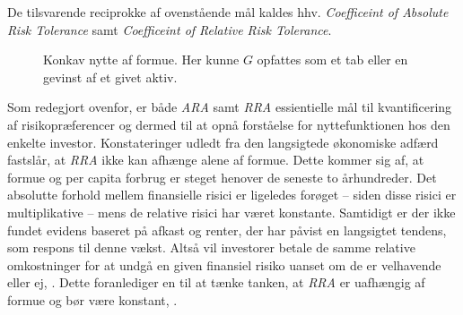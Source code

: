 \documentclass[
  a4paper,
  oneside]{memoir}
\begin{document}
De tilsvarende reciprokke af ovenstående mål kaldes hhv. \emph{Coefficeint of Absolute Risk Tolerance} samt \emph{Coefficeint of Relative Risk Tolerance}.

\begin{figure}[H]
\centering
{}
\caption[Konkav nytte af formue.]{Konkav nytte af formue. Her kunne $G$ opfattes som et tab eller en gevinst af et givet aktiv.}
\label{fig:Nyt}
\end{figure}

Som redegjort ovenfor, er både \emph{ARA} samt \emph{RRA} essientielle mål til kvantificering af risikopræferencer og dermed til at opnå forståelse for nyttefunktionen hos den enkelte investor. Konstateringer udledt fra den langsigtede økonomiske adfærd fastslår, at \emph{RRA} ikke kan afhænge alene af formue. Dette kommer sig af, at formue og per capita forbrug er steget henover de seneste to århundreder. Det absolutte forhold mellem finansielle risici er ligeledes forøget -- siden disse risici er multiplikative -- mens de relative risici har været konstante. Samtidigt er der ikke fundet evidens baseret på afkast og renter, der har påvist en langsigtet tendens, som respons til denne vækst. Altså vil investorer betale de samme relative omkostninger for at undgå en given finansiel risiko uanset om de er velhavende eller ej, \citep{CampVic2003}. Dette foranlediger en til at tænke tanken, at \emph{RRA} er uafhængig af formue og bør være konstant, \citep{Chiappori2008}.
\end{document}
